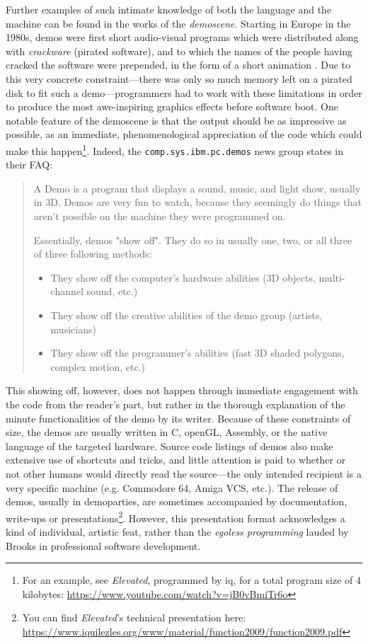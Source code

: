 Further examples of such intimate knowledge of both the language and the machine can be found in the works of the \emph{demoscene}. Starting in Europe in the 1980s, demos were first short audio-visual programs which were distributed along with \emph{crackware} (pirated software), and to which the names of the people having cracked the software were prepended, in the form of a short animation \citep{reunanen_computer_2010}. Due to this very concrete constraint—there was only so much memory left on a pirated disk to fit such a demo—programmers had to work with these limitations in order to produce the most awe-inspiring graphics effects before software boot. One notable feature of the demoscene is that the output should be as impressive as possible, as an immediate, phenomenological appreciation of the code which could make this happen\footnote{For an example, see \emph{Elevated}, programmed by iq, for a total program size of 4 kilobytes: \url{https://www.youtube.com/watch?v=jB0vBmiTr6o}}. Indeed, the \lstinline{comp.sys.ibm.pc.demos} news group states in their FAQ:

\begin{quote}
  A Demo is a program that displays a sound, music, and light show, usually in 3D. Demos are very fun to watch, because they seemingly do things that aren't possible on the machine they were programmed on.

  Essentially, demos "show off". They do so in usually one, two, or all three of three following methods:

  \begin{itemize}
    \item They show off the computer's hardware abilities (3D objects, multi-channel sound, etc.)
    \item They show off the creative abilities of the demo group (artists, musicians)
    \item They show off the programmer's abilities (fast 3D shaded polygons, complex motion, etc.) \citep{melik_pc_2012}
  \end{itemize}
\end{quote}

This showing off, however, does not happen through immediate engagement with the code from the reader's part, but rather in the thorough explanation of the minute functionalities of the demo by its writer. Because of these constraints of size, the demos are usually written in C, openGL, Assembly, or the native language of the targeted hardware. Source code listings of demos also make extensive use of shortcuts and tricks, and little attention is paid to whether or not other humans would directly read the source—the only intended recipient is a very specific machine (e.g. Commodore 64, Amiga VCS, etc.). The release of demos, usually in demoparties, are sometimes accompanied by documentation, write-ups or presentations\footnote{You can find \emph{Elevated}'s technical presentation here: \url{https://www.iquilezles.org/www/material/function2009/function2009.pdf}}. However, this presentation format acknowledges a kind of individual, artistic feat, rather than the \emph{egoless programming} lauded by Brooks in professional software development.

